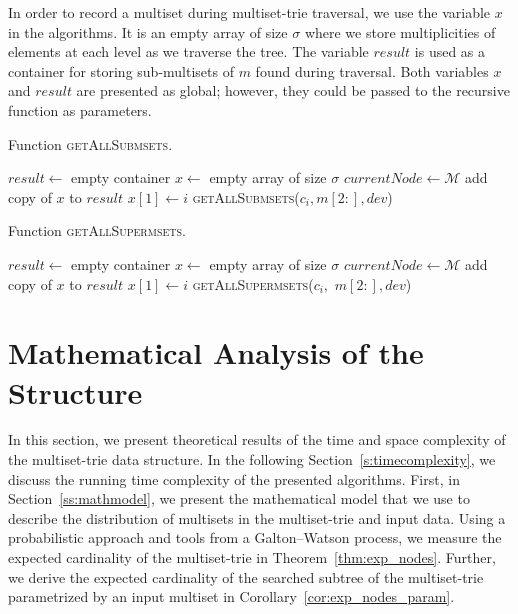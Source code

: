 \documentclass[algorithms,article,accept,pdftex,moreauthors]{Definitions/mdpi}
\begin{document}
In order to record a multiset during multiset-trie traversal, we use the variable $x$ in the algorithms.
It is an empty array of size $\sigma$ where we store multiplicities of elements at 
each level as we traverse the tree. The variable $result$ is used as a container for storing 
sub-multisets of $m$ found during traversal. Both variables $x$ and $result$ are presented 
as global; however, they could be passed to the recursive function as parameters.

\begin{algorithm}[H]
\caption{Function \textsc{getAllSubmsets}.}
\label{alg:getallsub}
\begin{algorithmic}[1]
\State $result \gets$ empty container
\State $x \gets$ empty array of size $\sigma$
\State $currentNode \gets \mathcal{M}$
\State add copy of $x$ to $result$ 
\EndIf
{}
\State $x[1]\gets i$
\State \textsc{getAllSubmsets}($c_i,m[2:], dev$)
\EndIf
\EndFor
\EndFunction
\end{algorithmic}
\end{algorithm}


\begin{algorithm}[H]
\caption{Function \textsc{getAllSupermsets}.}
\label{alg:getallsup}
\begin{algorithmic}[1]
\State $result \gets$ empty container
\State $x \gets$ empty array of size $\sigma$
\State $currentNode \gets \mathcal{M}$
\State add copy of $x$ to $result$ 
\EndIf
{}
\State $x[1]\gets i$
\textsc{getAllSupermsets}($c_i,$ $m[2:], dev$)
\EndIf
\EndFor
\EndFunction
\end{algorithmic}
\end{algorithm}
%
\section{Mathematical Analysis of the Structure} \label{c:analysis}
%
In this section, we present theoretical results of the time and space complexity of
the multiset-trie data structure. In the following Section~\ref{s:timecomplexity}, 
we discuss the running time complexity of the presented algorithms. First, in 
Section~\ref{ss:mathmodel}, we present the mathematical model that we use 
to describe the distribution of multisets in the multiset-trie and input data. 
Using a probabilistic approach and tools from a Galton--Watson process, we 
measure the expected cardinality of the multiset-trie in Theorem~\ref{thm:exp_nodes}. 
Further, we derive the expected cardinality of the searched subtree of the 
multiset-trie parametrized by an input multiset in Corollary~\ref{cor:exp_nodes_param}.
\end{document}
